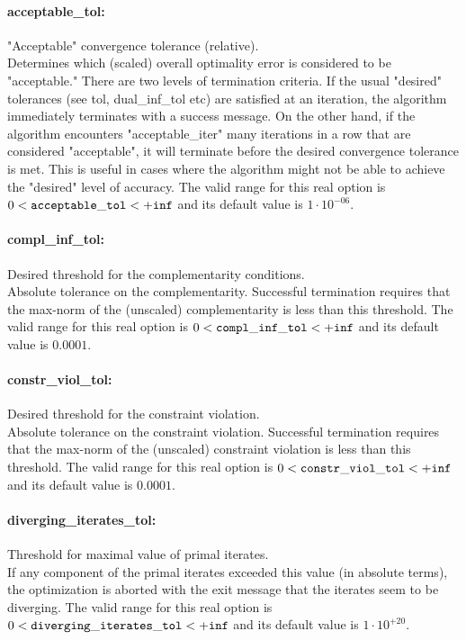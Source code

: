 \paragraph{acceptable\_tol:}\label{sec:acceptable_tol} "Acceptable" convergence tolerance (relative). $\;$ \\
 Determines which (scaled) overall optimality
error is considered to be "acceptable." There are
two levels of termination criteria.  If the usual
"desired" tolerances (see tol, dual\_inf\_tol
etc) are satisfied at an iteration, the algorithm
immediately terminates with a success message. 
On the other hand, if the algorithm encounters
"acceptable\_iter" many iterations in a row that
are considered "acceptable", it will terminate
before the desired convergence tolerance is met.
This is useful in cases where the algorithm might
not be able to achieve the "desired" level of
accuracy. The valid range for this real option is 
$0 <  {\tt acceptable\_tol } <  {\tt +inf}$
and its default value is $1 \cdot 10^{-06}$.


\paragraph{compl\_inf\_tol:}\label{sec:compl_inf_tol} Desired threshold for the complementarity conditions. $\;$ \\
 Absolute tolerance on the complementarity.
Successful termination requires that the max-norm
of the (unscaled) complementarity is less than
this threshold. The valid range for this real option is 
$0 <  {\tt compl\_inf\_tol } <  {\tt +inf}$
and its default value is $0.0001$.


\paragraph{constr\_viol\_tol:}\label{sec:constr_viol_tol} Desired threshold for the constraint violation. $\;$ \\
 Absolute tolerance on the constraint violation.
Successful termination requires that the max-norm
of the (unscaled) constraint violation is less
than this threshold. The valid range for this real option is 
$0 <  {\tt constr\_viol\_tol } <  {\tt +inf}$
and its default value is $0.0001$.


\paragraph{diverging\_iterates\_tol:}\label{sec:diverging_iterates_tol} Threshold for maximal value of primal iterates. $\;$ \\
 If any component of the primal iterates exceeded
this value (in absolute terms), the optimization
is aborted with the exit message that the
iterates seem to be diverging. The valid range for this real option is 
$0 <  {\tt diverging\_iterates\_tol } <  {\tt +inf}$
and its default value is $1 \cdot 10^{+20}$.


